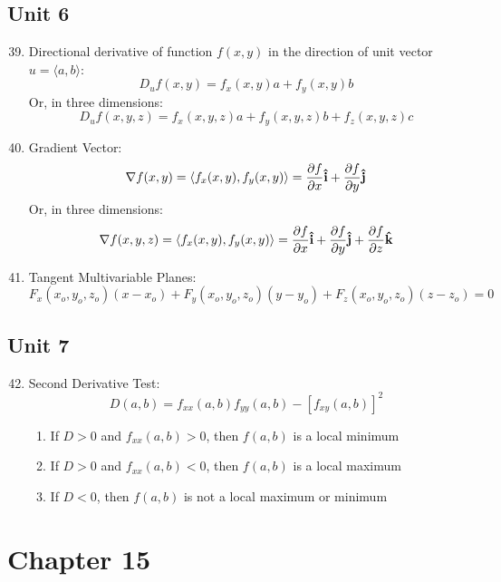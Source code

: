 \documentclass[12pt]{article}
\begin{document}
\subsection{Unit 6}

\begin{enumerate}
    \setcounter{enumi}{38}

  \item Directional derivative of function $f(x,y)$ in the direction of unit vector $u=\langle a,b \rangle$:
    $$D_uf(x,y)=f_x(x,y)a+f_y(x,y)b$$
    Or, in three dimensions:
    $$D_uf(x,y,z)=f_x(x,y,z)a+f_y(x,y,z)b+f_z(x,y,z)c$$

  \item Gradient Vector:
    $$\nabla f(x,y) = \langle f_x(x,y),f_y(x,y) \rangle=\frac{\partial f}{\partial x}\bold{\hat{i}}+\frac{\partial f}{\partial y}\bold{\hat{j}}$$
    Or, in three dimensions:
    $$\nabla f(x,y,z) = \langle f_x(x,y),f_y(x,y) \rangle=\frac{\partial f}{\partial x}\bold{\hat{i}}+\frac{\partial f}{\partial y}\bold{\hat{j}}+\frac{\partial f}{\partial z}\bold{\hat{k}}$$

  \item Tangent Multivariable Planes:
    $$F_x(x_o,y_o,z_o)(x-x_o)+F_y(x_o,y_o,z_o)(y-y_o)+F_z(x_o,y_o,z_o)(z-z_o)=0$$


\end{enumerate}

\subsection{Unit 7}

\begin{enumerate}
    \setcounter{enumi}{41}

  \item Second Derivative Test:
    $$D(a,b)=f_{xx}(a,b)f_{yy}(a,b)-[f_{xy}(a,b)]^2$$
    \begin{enumerate}

      \item If $D > 0$ and $f_{xx}(a,b) > 0$, then $f(a,b)$ is a local minimum
      \item If $D > 0$ and $f_{xx}(a,b) < 0$, then $f(a,b)$ is a local maximum
      \item If $D < 0$, then $f(a,b)$ is not a local maximum or minimum

    \end{enumerate}

\end{enumerate}

\section{Chapter 15}
\end{document}

